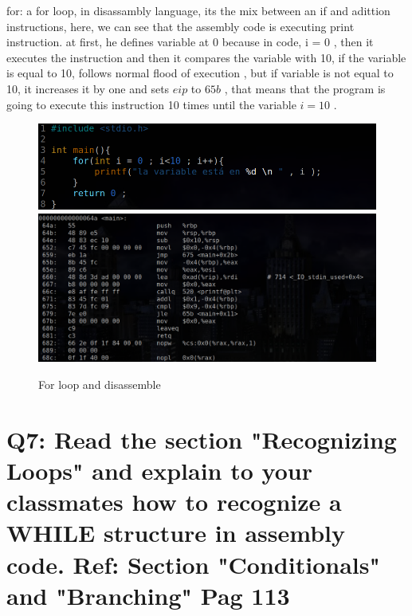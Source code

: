 \documentclass[10pt,a4paper]{article} %
\begin{document}
        for:
        a for loop, in disassambly language, its the mix between an if and
        adittion instructions, here, we can see that the assembly code is
        executing print instruction. at first, he defines variable at 0 because
        in code, i = 0 , then it executes the instruction and then it compares
        the variable with 10, if the variable is equal to 10, follows normal
        flood of execution , but if variable is not equal to 10, it increases
        it by one and sets $ eip  $  to $ 65b  $ , that means that the program
        is going to execute this instruction 10 times until the variable $ i =
        10 $ .
        \begin{figure}[h!]
            \centering
            \includegraphics[width=0.9\linewidth]{forcode.png}
            \includegraphics[width=0.9\linewidth]{fordis.png}
            \caption{For loop and disassemble}
            \label{for}
        \end{figure}

    \newpage
    \section{Q7: Read the section "Recognizing Loops" and explain to your
        classmates how to recognize a WHILE structure in assembly code.
        Ref: Section "Conditionals" and "Branching" Pag 113}
\end{document}

